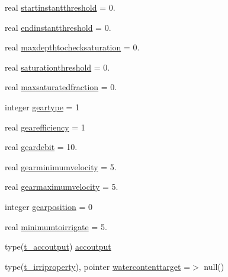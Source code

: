 \begin{DoxyCompactItemize}
\item 
real \mbox{\hyperlink{structmoduleirrigation_1_1t__irrischedule_a0101413981cc3f56c521edea2529a0e0}{startinstantthreshold}} = 0.
\item 
real \mbox{\hyperlink{structmoduleirrigation_1_1t__irrischedule_ae17d99bc8c1e680b3fd628ad45c6d8a5}{endinstantthreshold}} = 0.
\item 
real \mbox{\hyperlink{structmoduleirrigation_1_1t__irrischedule_a97f0c685b52e72b429594c3292025254}{maxdepthtochecksaturation}} = 0.
\item 
real \mbox{\hyperlink{structmoduleirrigation_1_1t__irrischedule_ae54fb12f81a9726b3e9b8f71953fa3b7}{saturationthreshold}} = 0.
\item 
real \mbox{\hyperlink{structmoduleirrigation_1_1t__irrischedule_ac622f37b22b607a1673421e824fec6d7}{maxsaturatedfraction}} = 0.
\item 
integer \mbox{\hyperlink{structmoduleirrigation_1_1t__irrischedule_a51644a28f3f7bb827dd10aaf146319ca}{geartype}} = 1
\item 
real \mbox{\hyperlink{structmoduleirrigation_1_1t__irrischedule_a995f029ad121911cebc14be7187af5bc}{gearefficiency}} = 1
\item 
real \mbox{\hyperlink{structmoduleirrigation_1_1t__irrischedule_a159cc56806c195974b27ae49bced60e8}{geardebit}} = 10.
\item 
real \mbox{\hyperlink{structmoduleirrigation_1_1t__irrischedule_a4115f4b4e48a3596b34de5049b17ac26}{gearminimumvelocity}} = 5.
\item 
real \mbox{\hyperlink{structmoduleirrigation_1_1t__irrischedule_a9efd8e0539f17f258583dd78cb50d4da}{gearmaximumvelocity}} = 5.
\item 
integer \mbox{\hyperlink{structmoduleirrigation_1_1t__irrischedule_af9d90d5423eba4d1fad7070543541146}{gearposition}} = 0
\item 
real \mbox{\hyperlink{structmoduleirrigation_1_1t__irrischedule_a62a2ed983c99cad2a3e3b645082fdb59}{minimumtoirrigate}} = 5.
\item 
type(\mbox{\hyperlink{structmoduleirrigation_1_1t__accoutput}{t\+\_\+accoutput}}) \mbox{\hyperlink{structmoduleirrigation_1_1t__irrischedule_a19e83059503e93ea86a22077522d8eb9}{accoutput}}
\item 
type(\mbox{\hyperlink{structmoduleirrigation_1_1t__irriproperty}{t\+\_\+irriproperty}}), pointer \mbox{\hyperlink{structmoduleirrigation_1_1t__irrischedule_aae6ed9ff137719d47f37c68be2474291}{watercontenttarget}} =$>$ null()
\item 

\end{DoxyCompactItemize}
